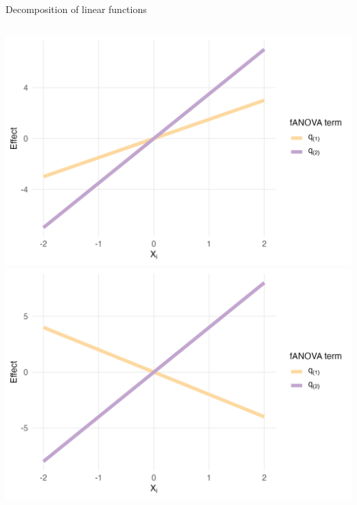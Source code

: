 \begin{frame}{Decomposition of linear functions}
  \begin{columns}
      \includegraphics[width=\linewidth]{../images/experiment_section/linear_a1p15_a2p35_a11p00_a22p00_a12p00_rhop00_main.png}
      \includegraphics[width=\linewidth]{../images/experiment_section/linear_a1m20_a2p40_a11p00_a22p00_a12p00_rhop00_main.png}
  \end{columns}
\end{frame}


